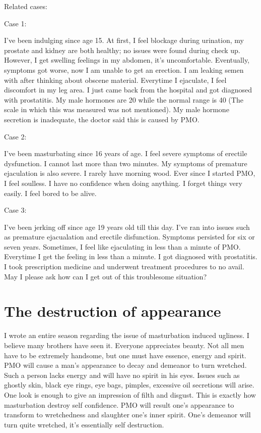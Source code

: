 \documentclass[
]{book}
\begin{document}
Related cases:

Case 1:

I've been indulging since age 15. At first, I feel blockage during urination, my prostate and kidney are both healthy; no issues were found during check up. However, I get swelling feelings in my abdomen, it's uncomfortable. Eventually, symptoms got worse, now I am unable to get an erection. I am leaking semen with after thinking about obscene material. Everytime I ejaculate, I feel discomfort in my leg area. I just came back from the hospital and got diagnosed with prostatitis. My male hormones are 20 while the normal range is 40 (The scale in which this was measured was not mentioned). My male hormone secretion is inadequate, the doctor said this is caused by PMO.

Case 2:

I've been masturbating since 16 years of age. I feel severe symptoms of erectile dysfunction. I cannot last more than two minutes. My symptoms of premature ejaculation is also severe. I rarely have morning wood. Ever since I started PMO, I feel soulless. I have no confidence when doing anything. I forget things very easily. I feel bored to be alive.

Case 3:

I've been jerking off since age 19 years old till this day. I've ran into issues such as premature ejacualation and erectile disfunction. Symptoms persisted for six or seven years. Sometimes, I feel like ejaculating in less than a minute of PMO. Everytime I get the feeling in less than a minute. I got diagnosed with prostatitis. I took prescription medicine and underwent treatment procedures to no avail. May I please ask how can I get out of this troublesome situation?

\hypertarget{the-destruction-of-appearance}{%
\section{The destruction of appearance}\label{the-destruction-of-appearance}}

I wrote an entire season regarding the issue of masturbation induced ugliness. I believe many brothers have seen it. Everyone appreciates beauty. Not all men have to be extremely handsome, but one must have essence, energy and spirit. PMO will cause a man's appearance to decay and demeanor to turn wretched. Such a person lacks energy and will have no spirit in his eyes. Issues such as ghostly skin, black eye rings, eye bags, pimples, excessive oil secretions will arise. One look is enough to give an impression of filth and disgust. This is exactly how masturbation destroy self confidence. PMO will result one's appearance to transform to wretchedness and slaughter one's inner spirit. One's demeanor will turn quite wretched, it's essentially self destruction.
\end{document}
